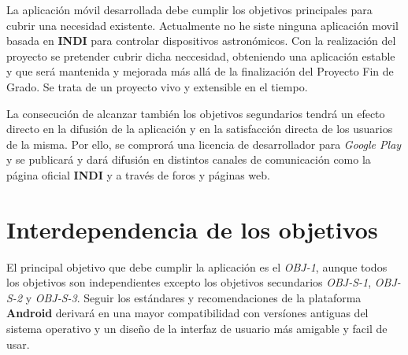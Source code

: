 La aplicación móvil desarrollada debe cumplir los objetivos principales para cubrir una necesidad existente. Actualmente no he siste ninguna aplicación movil basada en \textbf{INDI} para controlar dispositivos astronómicos. Con la realización del proyecto se pretender cubrir dicha neccesidad, obteniendo una aplicación estable y que será mantenida y mejorada más allá de la finalización del Proyecto Fin de Grado. Se trata de un proyecto vivo y extensible en el tiempo.

\bigskip
La consecución de alcanzar también los objetivos segundarios tendrá un efecto directo en la difusión de la aplicación y en la satisfacción directa de los usuarios de la misma. Por ello, se comprorá una licencia de desarrollador para \textit{Google Play} y se publicará y dará difusión en distintos canales de comunicación como la página oficial \textbf{INDI} y a través de foros y páginas web.


\section{Interdependencia de los objetivos}

El principal objetivo que debe cumplir la aplicación es el \textit{OBJ-1}, aunque todos los objetivos son independientes excepto los objetivos secundarios \textit{OBJ-S-1}, \textit{OBJ-S-2} y \textit{OBJ-S-3}. Seguir los estándares y recomendaciones de la plataforma \textbf{Android} derivará en una mayor compatibilidad con versíones antiguas del sistema operativo y un diseño de la interfaz de usuario más amigable y facil de usar. 